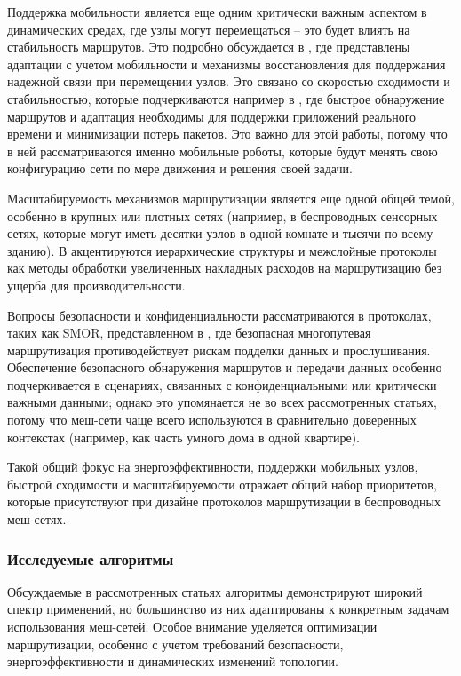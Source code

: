 \documentclass[%
]{report}
\begin{document}
Поддержка мобильности является еще одним
критически важным аспектом в динамических средах,
где узлы могут перемещаться -- это будет влиять на
стабильность маршрутов.
Это подробно обсуждается в \textcite{SHARMA2013416},
где представлены адаптации с учетом
мобильности и механизмы восстановления
для поддержания надежной связи при перемещении узлов.
Это связано со скоростью сходимости и стабильностью,
которые подчеркиваются например в \textcite{LI2020570},
где быстрое обнаружение маршрутов
и адаптация необходимы для поддержки
приложений реального времени и минимизации потерь пакетов.
Это важно для этой работы,
потому что в ней рассматриваются именно мобильные роботы,
которые будут менять свою конфигурацию сети
по мере движения и решения своей задачи.

Масштабируемость механизмов маршрутизации
является еще одной общей темой,
особенно в крупных или плотных сетях
(например, в беспроводных сенсорных сетях,
которые могут иметь десятки узлов в одной комнате
и тысячи по всему зданию).
В \textcite{ALVAREZ2008240}
акцентируются иерархические структуры
и межслойные протоколы как методы обработки
увеличенных накладных расходов на маршрутизацию
без ущерба для производительности.

Вопросы безопасности и конфиденциальности
рассматриваются в протоколах, таких как SMOR,
представленном в \textcite{KRENTZ202457},
где безопасная многопутевая маршрутизация
противодействует рискам подделки данных и прослушивания.
Обеспечение безопасного обнаружения маршрутов
и передачи данных особенно подчеркивается в сценариях,
связанных с конфиденциальными или критически важными данными;
однако это упомянается не во всех рассмотренных статьях,
потому что меш-сети чаще всего используются
в сравнительно доверенных контекстах (например,
как часть умного дома в одной квартире).

Такой общий фокус на энергоэффективности,
поддержки мобильных узлов, быстрой сходимости
и масштабируемости отражает
общий набор приоритетов,
которые присутствуют при дизайне протоколов
маршрутизации в беспроводных меш-сетях.


\subsubsection{Исследуемые алгоритмы}\label{used-algorithms}

Обсуждаемые в рассмотренных статьях алгоритмы демонстрируют
широкий спектр применений, но большинство из них адаптированы
к конкретным задачам использования меш-сетей.
Особое внимание уделяется оптимизации
маршрутизации, особенно с учетом требований безопасности,
энергоэффективности и динамических изменений топологии.
\end{document}
